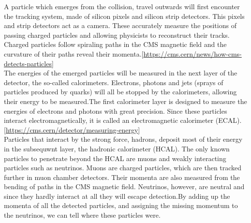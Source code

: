 A particle which emerges from the collision, travel outwards will first encounter the tracking system, made of silicon pixels and silicon strip detectors. This pixels and strip detectors act as a camera. These accurately measure the positions of passing charged particles and allowing physicists to reconstruct their tracks. Charged particles follow spiraling paths in the CMS magnetic field and the curvature of their paths reveal their momenta.[\url{https://cms.cern/news/how-cms-detects-particles}]\\
The energies of the emerged particles will be measured in the next layer of the detector, the so-called calorimeters. Electrons, photons and jets (sprays of particles produced by quarks) will all be stopped by the calorimeters, allowing their energy to be measured.The first calorimeter layer is designed to measure the energies of electrons and photons with great precision. Since these particles interact electromagnetically, it is called an electromagnetic calorimeter (ECAL).[\url{https://cms.cern/detector/measuring-energy}]\\
Particles that interact by the strong force, hadrons, deposit most of their energy in the subsequwnt layer, the hadronic calorimeter (HCAL). The only known particles to penetrate beyond the HCAL are muons and weakly interacting particles such as neutrinos. Muons are charged particles, which are then tracked further in muon chamber detectors. Their momenta are also measured from the bending of paths in the CMS magnetic field. Neutrinos, however, are neutral and since they hardly interact at all they will escape detection.By adding up the momenta of all the detected particles, and assigning the missing momentum to the neutrinos, we can tell where these particles were.\\

